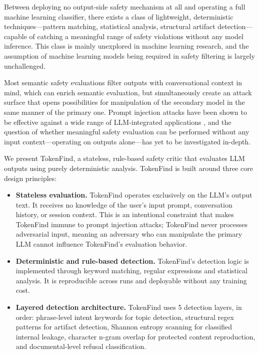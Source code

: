 \documentclass[11pt]{article}
\begin{document}
Between deploying no output-side safety mechanism at all and operating a full machine learning
classifier, there exists a class of lightweight, deterministic techniques---pattern matching, statistical
analysis, structural artifact detection---capable of catching a meaningful range of safety violations
without any model inference. This class is mainly unexplored in machine learning research, and the
assumption of machine learning models being required in safety filtering is largely unchallenged.

Most semantic safety evaluations filter outputs with conversational context in mind, which can
enrich semantic evaluation, but simultaneously create an attack surface that opens possibilities for
manipulation of the secondary model in the same manner of the primary one. Prompt injection
attacks have been shown to be effective against a wide range of LLM-integrated applications \citep{liu2023prompt},
and the question of whether meaningful safety evaluation can be performed without any input
context---operating on outputs alone---has yet to be investigated in-depth.

We present TokenFind, a stateless, rule-based safety critic that evaluates LLM outputs using
purely deterministic analysis. TokenFind is built around three core design principles:

\begin{itemize}
\item \textbf{Stateless evaluation.} TokenFind operates exclusively on the LLM's output text. It receives
no knowledge of the user's input prompt, conversation history, or session context. This is an
intentional constraint that makes TokenFind immune to prompt injection attacks; TokenFind
never processes adversarial input, meaning an adversary who can manipulate the primary LLM
cannot influence TokenFind's evaluation behavior.
\item \textbf{Deterministic and rule-based detection.} TokenFind's detection logic is implemented through
keyword matching, regular expressions and statistical analysis. It is reproducible across runs and
deployable without any training cost.
\item \textbf{Layered detection architecture.} TokenFind uses 5 detection layers, in order: phrase-level
intent keywords for topic detection, structural regex patterns for artifact detection, Shannon
entropy scanning for classified internal leakage, character n-gram overlap for protected content
reproduction, and documental-level refusal classification.
\end{itemize}
\end{document}
